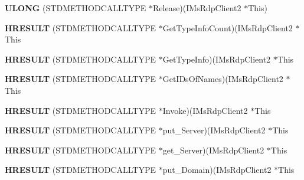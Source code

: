 \begin{DoxyCompactItemize}
\mbox{\label{struct_i_ms_rdp_client2_vtbl_a46098b7fbcac0a636127de57b9b91c93}} 
{\bfseries U\+L\+O\+NG} (S\+T\+D\+M\+E\+T\+H\+O\+D\+C\+A\+L\+L\+T\+Y\+PE $\ast$Release)(I\+Ms\+Rdp\+Client2 $\ast$This)
\item 
\mbox{\label{struct_i_ms_rdp_client2_vtbl_a3d2f425b859d5496aeb368f6b0d1dcbb}} 
{\bfseries H\+R\+E\+S\+U\+LT} (S\+T\+D\+M\+E\+T\+H\+O\+D\+C\+A\+L\+L\+T\+Y\+PE $\ast$Get\+Type\+Info\+Count)(I\+Ms\+Rdp\+Client2 $\ast$This
\item 
\mbox{\label{struct_i_ms_rdp_client2_vtbl_aaf033c921053d3119076478592f82637}} 
{\bfseries H\+R\+E\+S\+U\+LT} (S\+T\+D\+M\+E\+T\+H\+O\+D\+C\+A\+L\+L\+T\+Y\+PE $\ast$Get\+Type\+Info)(I\+Ms\+Rdp\+Client2 $\ast$This
\item 
\mbox{\label{struct_i_ms_rdp_client2_vtbl_a2ba6403dc7aea7688cb06905f813978f}} 
{\bfseries H\+R\+E\+S\+U\+LT} (S\+T\+D\+M\+E\+T\+H\+O\+D\+C\+A\+L\+L\+T\+Y\+PE $\ast$Get\+I\+Ds\+Of\+Names)(I\+Ms\+Rdp\+Client2 $\ast$This
\item 
\mbox{\label{struct_i_ms_rdp_client2_vtbl_a3e9c885392c5fec399e621ecca23be10}} 
{\bfseries H\+R\+E\+S\+U\+LT} (S\+T\+D\+M\+E\+T\+H\+O\+D\+C\+A\+L\+L\+T\+Y\+PE $\ast$Invoke)(I\+Ms\+Rdp\+Client2 $\ast$This
\item 
\mbox{\label{struct_i_ms_rdp_client2_vtbl_a8b1dbe83d885c0bdca5dd6167fae63e6}} 
{\bfseries H\+R\+E\+S\+U\+LT} (S\+T\+D\+M\+E\+T\+H\+O\+D\+C\+A\+L\+L\+T\+Y\+PE $\ast$put\+\_\+\+Server)(I\+Ms\+Rdp\+Client2 $\ast$This
\item 
\mbox{\label{struct_i_ms_rdp_client2_vtbl_a9326f3e77a7bee63af651918a3ebdf69}} 
{\bfseries H\+R\+E\+S\+U\+LT} (S\+T\+D\+M\+E\+T\+H\+O\+D\+C\+A\+L\+L\+T\+Y\+PE $\ast$get\+\_\+\+Server)(I\+Ms\+Rdp\+Client2 $\ast$This
\item 
\mbox{\label{struct_i_ms_rdp_client2_vtbl_a46748f1367b2f16043dbae3e1fdc7edd}} 
{\bfseries H\+R\+E\+S\+U\+LT} (S\+T\+D\+M\+E\+T\+H\+O\+D\+C\+A\+L\+L\+T\+Y\+PE $\ast$put\+\_\+\+Domain)(I\+Ms\+Rdp\+Client2 $\ast$This

\end{DoxyCompactItemize}
